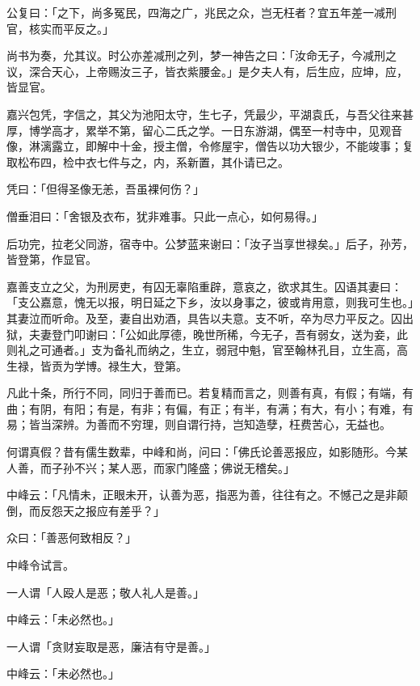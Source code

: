 \documentclass[12pt,twoside,openany]{book}
\begin{document}
公复曰：「之下，尚多冤民，四海之广，兆民之众，岂无枉者？宜五年差一减刑官，核实而平反之。」

尚书为奏，允其议。时公亦差减刑之列，梦一神告之曰：「汝命无子，今减刑之议，深合天心，上帝赐汝三子，皆衣紫腰金。」是夕夫人有，后生应，应坤，应，皆显官。

嘉兴包凭，字信之，其父为池阳太守，生七子，凭最少，平湖袁氏，与吾父往来甚厚，博学高才，累举不第，留心二氏之学。一日东游湖，偶至一村寺中，见观音像，淋漓露立，即解中十金，授主僧，令修屋宇，僧告以功大银少，不能竣事；复取松布四，检中衣七件与之，内，系新置，其仆请已之。

凭曰：「但得圣像无恙，吾虽裸何伤？」

僧垂泪曰：「舍银及衣布，犹非难事。只此一点心，如何易得。」

后功完，拉老父同游，宿寺中。公梦蓝来谢曰：「汝子当享世禄矣。」后子，孙芳，皆登第，作显官。

嘉善支立之父，为刑房吏，有囚无辜陷重辟，意哀之，欲求其生。囚语其妻曰：「支公嘉意，愧无以报，明日延之下乡，汝以身事之，彼或肯用意，则我可生也。」其妻泣而听命。及至，妻自出劝酒，具告以夫意。支不听，卒为尽力平反之。囚出狱，夫妻登门叩谢曰：「公如此厚德，晚世所稀，今无子，吾有弱女，送为妾，此则礼之可通者。」支为备礼而纳之，生立，弱冠中魁，官至翰林孔目，立生高，高生禄，皆贡为学博。禄生大，登第。

凡此十条，所行不同，同归于善而已。若复精而言之，则善有真，有假；有端，有曲；有阴，有阳；有是，有非；有偏，有正；有半，有满；有大，有小；有难，有易；皆当深辨。为善而不穷理，则自谓行持，岂知造孽，枉费苦心，无益也。

何谓真假？昔有儒生数辈，中峰和尚，问曰：「佛氏论善恶报应，如影随形。今某人善，而子孙不兴；某人恶，而家门隆盛；佛说无稽矣。」

中峰云：「凡情未，正眼未开，认善为恶，指恶为善，往往有之。不憾己之是非颠倒，而反怨天之报应有差乎？」

众曰：「善恶何致相反？」

中峰令试言。

一人谓「人殴人是恶；敬人礼人是善。」

中峰云：「未必然也。」

一人谓「贪财妄取是恶，廉洁有守是善。」

中峰云：「未必然也。」
\end{document}
